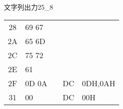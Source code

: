 \begin{reidai}{文字列出力2}{5_8}
\begin{description}
{\begin{center}
\begin{tabular}{|c|l|l|l l|}
28 &  69 67  &        &         &                \\
2A &  65 6D  &        &         &                \\
2C &  75 72  &        &         &                \\
2E &  61     &        &         &                \\
2F &  0D 0A  &        &  DC     & 0DH,0AH        \\
31 &  00     &        &  DC     & 00H            \\
\hline
\end{tabular}
\end{center}}
\end{description}
\end{reidai}

\newpage
